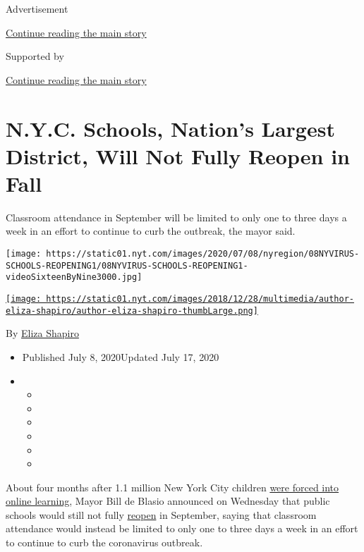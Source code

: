 Advertisement

\protect\hyperlink{after-top}{Continue reading the main story}

Supported by

\protect\hyperlink{after-sponsor}{Continue reading the main story}

\hypertarget{nyc-schools-nations-largest-district-will-not-fully-reopen-in-fall}{%
\section{N.Y.C. Schools, Nation's Largest District, Will Not Fully
Reopen in
Fall}\label{nyc-schools-nations-largest-district-will-not-fully-reopen-in-fall}}

Classroom attendance in September will be limited to only one to three
days a week in an effort to continue to curb the outbreak, the mayor
said.

\texttt{[image: https://static01.nyt.com/images/2020/07/08/nyregion/08NYVIRUS-SCHOOLS-REOPENING1/08NYVIRUS-SCHOOLS-REOPENING1-videoSixteenByNine3000.jpg]}

\href{https://www.nytimes.com/by/eliza-shapiro}{\texttt{[image: https://static01.nyt.com/images/2018/12/28/multimedia/author-eliza-shapiro/author-eliza-shapiro-thumbLarge.png]}}

By \href{https://www.nytimes.com/by/eliza-shapiro}{Eliza Shapiro}

\begin{itemize}
\item
  Published July 8, 2020Updated July 17, 2020
\item
  \begin{itemize}
  \item
  \item
  \item
  \item
  \item
  \item
  \end{itemize}
\end{itemize}

About four months after 1.1 million New York City children
\href{https://www.nytimes.com/2020/03/15/nyregion/nyc-schools-closed.html}{were
forced into online learning}, Mayor Bill de Blasio announced on
Wednesday that public schools would still not fully
\href{https://www.nytimes.com/article/new-york-phase-reopening.html}{reopen}
in September, saying that classroom attendance would instead be limited
to only one to three days a week in an effort to continue to curb the
coronavirus outbreak.

